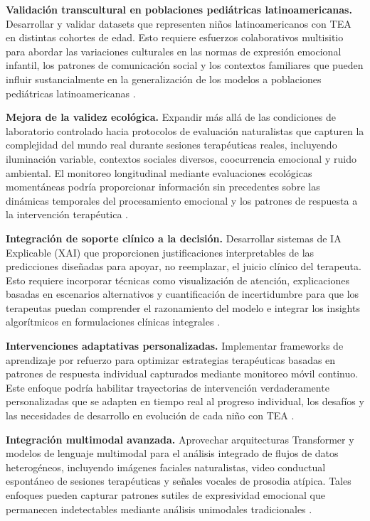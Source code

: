 \documentclass[3p,twocolumn,times]{elsarticle}
\begin{document}
	\textbf{Validación transcultural en poblaciones pediátricas latinoamericanas.}
	Desarrollar y validar datasets que representen niños latinoamericanos con TEA en
	distintas cohortes de edad. Esto requiere esfuerzos colaborativos multisitio para
	abordar las variaciones culturales en las normas de expresión emocional infantil,
	los patrones de comunicación social y los contextos familiares que pueden influir
	sustancialmente en la generalización de los modelos a poblaciones pediátricas
	latinoamericanas \cite{Shaik2025,Washington2022}.
	
	\textbf{Mejora de la validez ecológica.} Expandir más allá de las condiciones de
	laboratorio controlado hacia protocolos de evaluación naturalistas que capturen la
	complejidad del mundo real durante sesiones terapéuticas reales, incluyendo
	iluminación variable, contextos sociales diversos, coocurrencia emocional y ruido
	ambiental. El monitoreo longitudinal mediante evaluaciones ecológicas momentáneas
	podría proporcionar información sin precedentes sobre las dinámicas temporales del
	procesamiento emocional y los patrones de respuesta a la intervención terapéutica
	\cite{Johnson2025,Rudovic2018}.
	
	\textbf{Integración de soporte clínico a la decisión.} Desarrollar sistemas de IA
	Explicable (XAI) que proporcionen justificaciones interpretables de las predicciones
	diseñadas para apoyar, no reemplazar, el juicio clínico del terapeuta. Esto requiere
	incorporar técnicas como visualización de atención, explicaciones basadas en
	escenarios alternativos y cuantificación de incertidumbre para que los terapeutas
	puedan comprender el razonamiento del modelo e integrar los insights algorítmicos
	en formulaciones clínicas integrales \cite{Rhatassi2024,Radocaj2025}.
	
	\textbf{Intervenciones adaptativas personalizadas.} Implementar frameworks de
	aprendizaje por refuerzo para optimizar estrategias terapéuticas basadas en patrones
	de respuesta individual capturados mediante monitoreo móvil continuo. Este enfoque
	podría habilitar trayectorias de intervención verdaderamente personalizadas que se
	adapten en tiempo real al progreso individual, los desafíos y las necesidades de
	desarrollo en evolución de cada niño con TEA \cite{Rudovic2019}.
	
	\textbf{Integración multimodal avanzada.} Aprovechar arquitecturas Transformer y
	modelos de lenguaje multimodal para el análisis integrado de flujos de datos
	heterogéneos, incluyendo imágenes faciales naturalistas, video conductual espontáneo
	de sesiones terapéuticas y señales vocales de prosodia atípica. Tales enfoques
	pueden capturar patrones sutiles de expresividad emocional que permanecen
	indetectables mediante análisis unimodales tradicionales \cite{Washington2022}.
	
\end{document}
